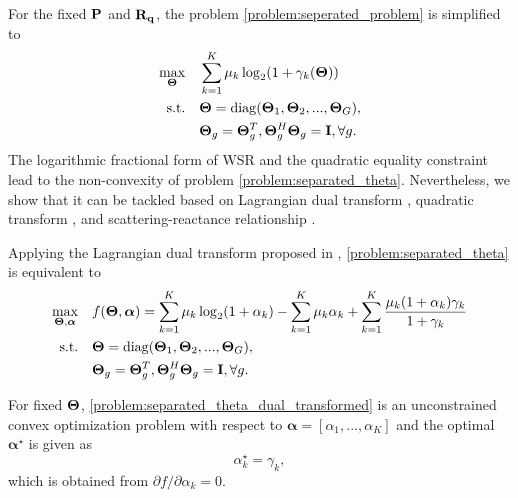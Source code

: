 For the fixed $\bf{P}$ and ${\bf{R}}_{\bf q}$, the problem \eqref{problem:seperated_problem} is simplified to
\begin{subequations} \label{problem:separated_theta}
    \begin{align}
        \max_{\mathbf{\Theta}} \quad & \sum_{k=1}^K \mu_k \log_2 ( 1 + \gamma_k (\mathbf{\Theta})) 
        \\ \mathrm{s.t.} \quad & {\bf \Theta} = \mathrm{diag}({\bf \Theta}_1,{\bf \Theta}_2,...,{\bf \Theta}_G) ,
        \\ &{\bf \Theta}_g = {\bf \Theta}_g^T, {\bf \Theta}_g^H{\bf \Theta}_g = {\bf I}, \forall g .
    \end{align}
\end{subequations}
The logarithmic fractional form of WSR and the quadratic equality constraint lead to the non-convexity of problem \eqref{problem:separated_theta}.
Nevertheless, we show that it can be tackled based on Lagrangian dual transform \cite{shen2018fractional2}, quadratic transform \cite{shen2018fractional},
and scattering-reactance relationship \cite{shen2020modeling}.

Applying the Lagrangian dual transform proposed in \cite{shen2018fractional2},
\eqref{problem:separated_theta} is equivalent to 
\begin{subequations} \label{problem:separated_theta_dual_transformed}
    \begin{align}
        \max_{\mathbf{\Theta},\boldsymbol{\alpha}} \quad & f(\mathbf{\Theta},\boldsymbol{\alpha}) = \sum_{k=1}^K\mu_k\log_2(1+\alpha_k)-\sum_{k=1}^K\mu_k\alpha_k +\sum_{k=1}^K \frac{\mu_k(1+\alpha_k)\gamma_k}{1+\gamma_k}\\
        \mathrm{s.t.} \quad &  {\bf \Theta} = \mathrm{diag}({\bf \Theta}_1,{\bf \Theta}_2,...,{\bf \Theta}_G) ,
        \\ &{\bf \Theta}_g = {\bf \Theta}_g^T, {\bf \Theta}_g^H{\bf \Theta}_g = {\bf I}, \forall g.
    \end{align}
\end{subequations}


For fixed $\bf{\Theta}$, \eqref{problem:separated_theta_dual_transformed} is an unconstrained convex optimization
problem with respect to $\boldsymbol{\alpha} = [\alpha_1,...,\alpha_K]$ and the optimal $\boldsymbol{\alpha}^\star$ is given as
\begin{equation} \label{eqn:separated_optimal_alpha}
    \alpha^\star_k=\gamma_k,
\end{equation}
which is obtained from ${\partial f}/{\partial \alpha_k} = 0$.

